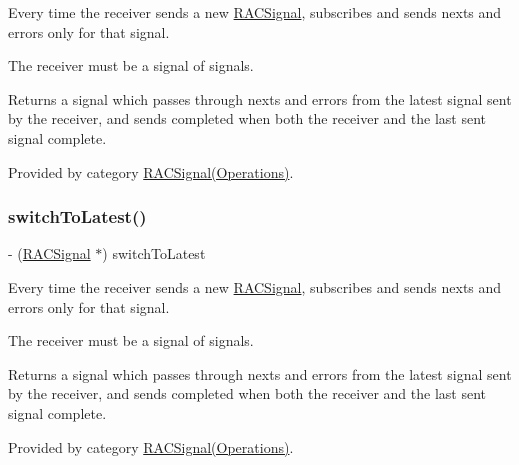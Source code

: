 Every time the receiver sends a new \mbox{\hyperlink{interface_r_a_c_signal}{R\+A\+C\+Signal}}, subscribes and sends {\ttfamily next}s and {\ttfamily error}s only for that signal.

The receiver must be a signal of signals.

Returns a signal which passes through {\ttfamily next}s and {\ttfamily error}s from the latest signal sent by the receiver, and sends {\ttfamily completed} when both the receiver and the last sent signal complete. 

Provided by category \mbox{\hyperlink{category_r_a_c_signal_07_operations_08_a0a6780c4580e1a5338a9a891f7c69ea1}{R\+A\+C\+Signal(\+Operations)}}.

\mbox{\label{interface_r_a_c_signal_a0a6780c4580e1a5338a9a891f7c69ea1}} 
\subsubsection{\texorpdfstring{switch\+To\+Latest()}{switchToLatest()}\hspace{0.1cm}{\footnotesize\ttfamily [2/3]}}
{\footnotesize\ttfamily -\/ (\mbox{\hyperlink{interface_r_a_c_signal}{R\+A\+C\+Signal}} $\ast$) switch\+To\+Latest \begin{DoxyParamCaption}{ }\end{DoxyParamCaption}}

Every time the receiver sends a new \mbox{\hyperlink{interface_r_a_c_signal}{R\+A\+C\+Signal}}, subscribes and sends {\ttfamily next}s and {\ttfamily error}s only for that signal.

The receiver must be a signal of signals.

Returns a signal which passes through {\ttfamily next}s and {\ttfamily error}s from the latest signal sent by the receiver, and sends {\ttfamily completed} when both the receiver and the last sent signal complete. 

Provided by category \mbox{\hyperlink{category_r_a_c_signal_07_operations_08_a0a6780c4580e1a5338a9a891f7c69ea1}{R\+A\+C\+Signal(\+Operations)}}.

\mbox{\label{interface_r_a_c_signal_a0a6780c4580e1a5338a9a891f7c69ea1}} 
